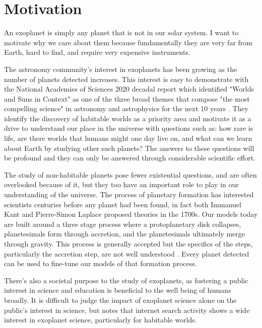 \section{Motivation}
\label{sec:motivation}

An exoplanet is simply any planet that is not in our solar system. I want to
motivate why we care about them because fundamentally they are very far from
Earth, hard to find, and require very expensive instruments. 

The astronomy community's interest in exoplanets has been growing as the number
of planets detected increases. This interest is easy to demonstrate with the
National Academies of Sciences 2020 decadal report which identified "Worlds and
Suns in Context" as one of the three broad themes that compose "the most
compelling science" in astronomy and astrophysics for the next 10 years
\citep{nationalacademiesofsciencesPathwaysDiscoveryAstronomy2021}. They
identify the discovery of habitable worlds as a priority area and motivate it
as a drive to understand our place in the universe with questions such as: how
rare is life, are there worlds that humans might one day live on, and what can we
learn about Earth by studying other such planets? The answers to these questions
will be profound and they can only be answered through considerable scientific
effort.

The study of non-habitable planets pose fewer existential questions, and are
often overlooked because of it, but they too have an important role to play in
our understanding of the universe. The process of planetary formation has
interested scientists centuries before any planet had been found, in fact both
Immanuel Kant and Pierre-Simon Laplace proposed theories \citep{Perryman2018a}
in the 1700s. Our models today are built around a three stage process where a
protoplanetary disk collapses, planetesimals form through accretion, and the
planetesimals ultimately merge through gravity. This process is generally
accepted but the specifics of the steps, particularly the accretion step, are
not well understood \citep{Perryman2018a}. Every planet detected can be used to
fine-tune our models of that formation process.

There's also a societal purpose to the study of exoplanets, as fostering a
public interest in science and education is beneficial to the well being of
humans broadly. It is difficult to judge the impact of exoplanet science alone
on the public's interest in science, but \citet{deegImpactExoplanet2018} notes
that internet search activity shows a wide interest in exoplanet science,
particularly for habitable worlds.

